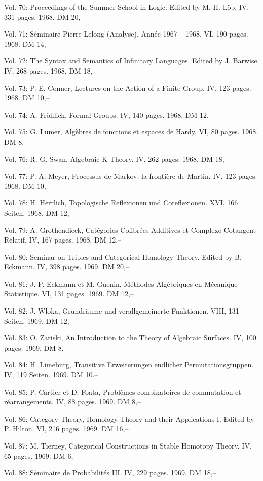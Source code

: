 Vol. 70: Proceedings of the Summer School in Logic. Edited by M. H. Löb. IV, 331 pages. 1968. DM 20,--

Vol. 71: Séminaire Pierre Lelong (Analyse), Année 1967 -- 1968. VI, 190 pages. 1968. DM 14,

Vol. 72: The Syntax and Semantics of Infinitary Languages. Edited by J. Barwise. IV, 268 pages. 1968. DM 18,--

Vol. 73: P. E. Conner, Lectures on the Action of a Finite Group. IV, 123 pages. 1968. DM 10,--

Vol. 74: A. Fröhlich, Formal Groups. IV, 140 pages. 1968. DM 12,--

Vol. 75: G. Lumer, Algèbres de fonctions et espaces de Hardy. VI, 80 pages. 1968. DM 8,--

Vol. 76: R. G. Swan, Algebraic K-Theory. IV, 262 pages. 1968. DM 18,--

Vol. 77: P.-A. Meyer, Processus de Markov: la frontière de Martin. IV, 123 pages. 1968. DM 10,--

Vol. 78: H. Herrlich, Topologische Reflexionen und Coreflexionen. XVI, 166 Seiten. 1968. DM 12,--

Vol. 79: A. Grothendieck, Catégories Cofibrées Additives et Complexe Cotangent Relatif. IV, 167 pages. 1968. DM 12,--

Vol. 80: Seminar on Triples and Categorical Homology Theory. Edited by B. Eckmann. IV, 398 pages. 1969. DM 20,--

Vol. 81: J.-P. Eckmann et M. Guenin, Méthodes Algébriques en Mécanique Statistique. VI, 131 pages. 1969. DM 12,--

Vol. 82: J. Wloka, Grundräume und verallgemeinerte Funktionen. VIII, 131 Seiten. 1969. DM 12,--

Vol. 83: O. Zariski, An Introduction to the Theory of Algebraic Surfaces. IV, 100 pages. 1969. DM 8,--

Vol. 84: H. Lüneburg, Transitive Erweiterungen endlicher Permutationsgruppen. IV, 119 Seiten. 1969. DM 10.--

Vol. 85: P. Cartier et D. Foata, Problèmes combinatoires de commutation et réarrangements. IV, 88 pages. 1969. DM 8,--

Vol. 86: Category Theory, Homology Theory and their Applications I. Edited by P. Hilton. VI, 216 pages. 1969. DM 16,--

Vol. 87: M. Tierney, Categorical Constructions in Stable Homotopy Theory. IV, 65 pages. 1969. DM 6,--

Vol. 88: Séminaire de Probabilités III. IV, 229 pages. 1969. DM 18,--

